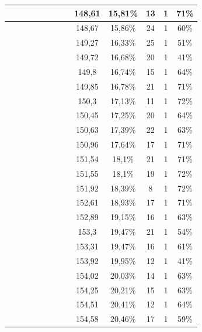 \begin{center}
\begin{longtable}{|c|c|c|c|c|c|c|c|c|c|c|c|c|}
 \x &  &  \x &  \x &  \x &  \x &  &  & 148,61 & 15,81\% & 13 & 1 & 71\% \\ \hline
 \x &  &  &  \x &  \x &  &  &  \x & 148,67 & 15,86\% & 24 & 1 & 60\% \\ \hline
 \x &  &  &  \x &  &  &  &  \x & 149,27 & 16,33\% & 25 & 1 & 51\% \\ \hline
 \x &  &  &  &  &  &  &  & 149,72 & 16,68\% & 20 & 1 & 41\% \\ \hline
 \x &  &  \x &  &  &  &  \x &  & 149,8 & 16,74\% & 15 & 1 & 64\% \\ \hline
 \x &  \x &  \x &  \x &  &  \x &  &  & 149,85 & 16,78\% & 21 & 1 & 71\% \\ \hline
 \x &  &  &  &  &  \x &  \x &  \x & 150,3 & 17,13\% & 11 & 1 & 72\% \\ \hline
 \x &  \x &  \x &  \x &  &  &  \x &  & 150,45 & 17,25\% & 20 & 1 & 64\% \\ \hline
 \x &  &  \x &  \x &  \x &  &  &  & 150,63 & 17,39\% & 22 & 1 & 63\% \\ \hline
 \x &  &  \x &  \x &  &  \x &  &  & 150,96 & 17,64\% & 17 & 1 & 71\% \\ \hline
 \x &  &  \x &  &  \x &  \x &  &  & 151,54 & 18,1\% & 21 & 1 & 71\% \\ \hline
 \x &  &  &  &  \x &  \x &  &  \x & 151,55 & 18,1\% & 19 & 1 & 72\% \\ \hline
 \x &  &  \x &  &  &  \x &  \x &  \x & 151,92 & 18,39\% & 8 & 1 & 72\% \\ \hline
 \x &  \x &  &  &  \x &  \x &  \x &  & 152,61 & 18,93\% & 17 & 1 & 71\% \\ \hline
 \x &  \x &  \x &  &  \x &  &  \x &  & 152,89 & 19,15\% & 16 & 1 & 63\% \\ \hline
 \x &  \x &  &  &  &  &  \x &  & 153,3 & 19,47\% & 21 & 1 & 54\% \\ \hline
 \x &  \x &  &  &  \x &  &  \x &  & 153,31 & 19,47\% & 16 & 1 & 61\% \\ \hline
 \x &  &  &  &  &  &  \x &  & 153,92 & 19,95\% & 12 & 1 & 41\% \\ \hline
 \x &  &  \x &  \x &  &  &  &  & 154,02 & 20,03\% & 14 & 1 & 63\% \\ \hline
 \x &  \x &  \x &  \x &  \x &  &  &  \x & 154,25 & 20,21\% & 15 & 1 & 63\% \\ \hline
 \x &  \x &  \x &  &  \x &  &  \x &  \x & 154,51 & 20,41\% & 12 & 1 & 64\% \\ \hline
 \x &  &  &  &  \x &  &  \x &  & 154,58 & 20,46\% & 17 & 1 & 59\% \\ \hline

\end{longtable}
\end{center}
